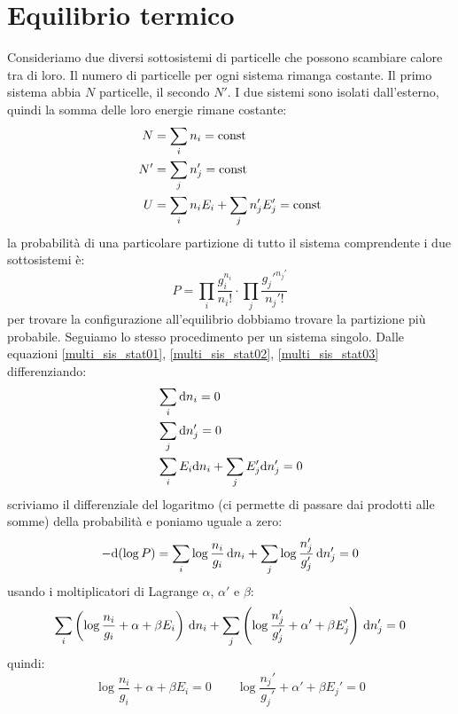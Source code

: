 \section{Equilibrio termico}
Consideriamo due diversi sottosistemi di particelle che possono scambiare calore tra di loro. Il numero di particelle per ogni sistema rimanga costante. Il primo sistema abbia $N$ particelle, il secondo $N'$. I due sistemi sono isolati dall'esterno, quindi la somma delle loro energie rimane costante:
\begin{align}
	\label{multi_sis_stat01}
	N  & =\sum_i n_i=\text{const}                    \\
	\label{multi_sis_stat02}
	N' & =\sum_j n_j'=\text{const}                   \\
	\label{multi_sis_stat03}
	U  & =\sum_i n_iE_i+\sum_j n_j'E_j'=\text{const}
\end{align}
la probabilità di una particolare partizione di tutto il sistema comprendente i due sottosistemi è:
\begin{equation}
	P=\prod_i\frac{g_i^{n_i}}{n_i!}\cdot\prod_j\frac{g_j'^{n_j'}}{n_j'!}
\end{equation}
per trovare la configurazione all'equilibrio dobbiamo trovare la partizione più probabile. Seguiamo lo stesso procedimento per un sistema singolo. Dalle equazioni \eqref{multi_sis_stat01}, \eqref{multi_sis_stat02}, \eqref{multi_sis_stat03} differenziando:
\begin{align}
	 & \sum_i\mathrm{d} n_i=0                         \\
	 & \sum_j\mathrm{d} n_j'=0                        \\
	 & \sum_i E_i\mathrm{d} n_i+\sum_j E_j'\mathrm{d} n_j'=0
\end{align}
scriviamo il differenziale del logaritmo (ci permette di passare dai prodotti alle somme) della probabilità e poniamo uguale a zero:
\begin{equation}
	-\mathrm{d}(\log P)=\sum_i\log\frac{n_i}{g_i}\,\mathrm{d} n_i+\sum_j\log\frac{n_j'}{g_j'}\,\mathrm{d} n_j'=0
\end{equation}
usando i moltiplicatori di Lagrange $\alpha$, $\alpha'$ e $\beta$:
\begin{equation}
	\sum_i\left(\log\frac{n_i}{g_i}+\alpha+\beta E_i\right)\,\mathrm{d} n_i+\sum_j\left(\log\frac{n_j'}{g_j'}+\alpha'+\beta E_j'\right)\,\mathrm{d} n_j'=0
\end{equation}
quindi:
\begin{equation}
	\log\frac{n_i}{g_i}+\alpha+\beta E_i=0\qquad\log\frac{n_j'}{g_j'}+\alpha'+\beta E_j'=0
\end{equation}

